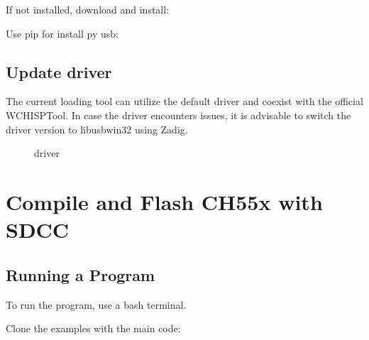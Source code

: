 \documentclass[letterpaper,10pt,english]{sphinxmanual}
\begin{document}
\sphinxAtStartPar
If not installed, download and install:
\sphinxhyphen{} 

\sphinxAtStartPar
Use pip for install py usb:

\begin{sphinxVerbatim}[commandchars=\\\{\}]
  
\end{sphinxVerbatim}


\section{Update driver}
\label{\detokenize{install_windows:update-driver}}
\sphinxAtStartPar
The current loading tool can utilize the default driver and coexist with the official WCHISPTool. In case the driver encounters issues, it is advisable to switch the driver version to libusb\sphinxhyphen{}win32 using Zadig.

\begin{figure}[htbp]
\centering
\capstart

\noindent{}
\caption{driver}\label{\detokenize{install_windows:id5}}\label{\detokenize{install_windows:driver}}\end{figure}

\sphinxstepscope


\chapter{Compile and Flash CH55x with SDCC}
\label{\detokenize{compile:compile-and-flash-ch55x-with-sdcc}}\label{\detokenize{compile::doc}}

\section{Running a Program}
\label{\detokenize{compile:running-a-program}}
\sphinxAtStartPar
To run the program, use a bash terminal.

\sphinxAtStartPar
Clone the examples with the main code:

\begin{sphinxVerbatim}[commandchars=\\\{\}]
  
\end{sphinxVerbatim}
\end{document}
